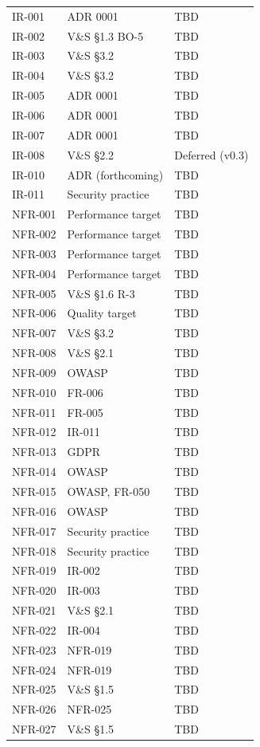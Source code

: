 \documentclass[11pt,a4paper]{article}
\begin{document}
\begin{longtable}{lll}
IR-001 & ADR 0001 & TBD \\
IR-002 & V\&S \S1.3 BO-5 & TBD \\
IR-003 & V\&S \S3.2 & TBD \\
IR-004 & V\&S \S3.2 & TBD \\
IR-005 & ADR 0001 & TBD \\
IR-006 & ADR 0001 & TBD \\
IR-007 & ADR 0001 & TBD \\
IR-008 & V\&S \S2.2 & Deferred (v0.3) \\
IR-010 & ADR (forthcoming) & TBD \\
IR-011 & Security practice & TBD \\
NFR-001 & Performance target & TBD \\
NFR-002 & Performance target & TBD \\
NFR-003 & Performance target & TBD \\
NFR-004 & Performance target & TBD \\
NFR-005 & V\&S \S1.6 R-3 & TBD \\
NFR-006 & Quality target & TBD \\
NFR-007 & V\&S \S3.2 & TBD \\
NFR-008 & V\&S \S2.1 & TBD \\
NFR-009 & OWASP & TBD \\
NFR-010 & FR-006 & TBD \\
NFR-011 & FR-005 & TBD \\
NFR-012 & IR-011 & TBD \\
NFR-013 & GDPR & TBD \\
NFR-014 & OWASP & TBD \\
NFR-015 & OWASP, FR-050 & TBD \\
NFR-016 & OWASP & TBD \\
NFR-017 & Security practice & TBD \\
NFR-018 & Security practice & TBD \\
NFR-019 & IR-002 & TBD \\
NFR-020 & IR-003 & TBD \\
NFR-021 & V\&S \S2.1 & TBD \\
NFR-022 & IR-004 & TBD \\
NFR-023 & NFR-019 & TBD \\
NFR-024 & NFR-019 & TBD \\
NFR-025 & V\&S \S1.5 & TBD \\
NFR-026 & NFR-025 & TBD \\
NFR-027 & V\&S \S1.5 & TBD \\

\end{longtable}
\end{document}
